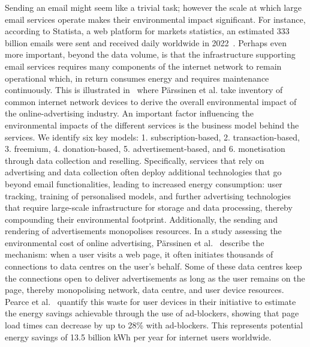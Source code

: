 \documentclass[sigconf,9pt,usenames,dvipsnames,table]{acmart}
\begin{document}
Sending an email might seem like a trivial task; however the scale at which
large email services operate makes their environmental impact significant.
For instance,
according to Statista, a web platform for markets statistics, an estimated
333 billion emails were sent and received daily worldwide in 2022~\cite{statistaemails2024}.
Perhaps even more important, beyond the data volume, is that the infrastructure supporting email services requires many components of the internet network to remain operational which, in return consumes energy and requires maintenance continuously.
This is illustrated in~\cite{parssinen_environmental_2018} where P\"arssinen et al. take inventory of common internet network devices
to derive the overall environmental impact of the online-advertising
industry.
%
An important factor influencing the environmental impacts of the different
services is the business model behind the services. We identify six key
models: 1. subscription-based, 2. transaction-based, 3.  freemium, 4.
donation-based, 5. advertisement-based, and 6. monetisation through data
collection and reselling. Specifically, services that rely on advertising and
data collection often deploy additional technologies that go beyond
email
functionalities, leading to increased energy consumption: user tracking,
training of personalised models, and further advertising
technologies that require large-scale infrastructure for storage and data
processing, thereby compounding their environmental footprint.
Additionally, the
sending and rendering of advertisements monopolises resources. In a study
assessing the environmental cost of online advertising, P\"arssinen et al.~\cite{parssinen_environmental_2018} describe the mechanism: when a user visits a web page, it often initiates thousands of connections to data centres on the user’s behalf. Some of these data centres keep the connections open to deliver advertisements as long as the user remains on the page, thereby monopolising network, data centre, and user device resources. Pearce et al.~\cite{pearce2020energy} quantify this waste for user devices in their initiative to estimate the energy savings achievable through the use of ad-blockers, showing that page load times can decrease by up to 28\% with ad-blockers. This represents potential energy savings of 13.5 billion kWh per year for internet users worldwide.
\end{document}
